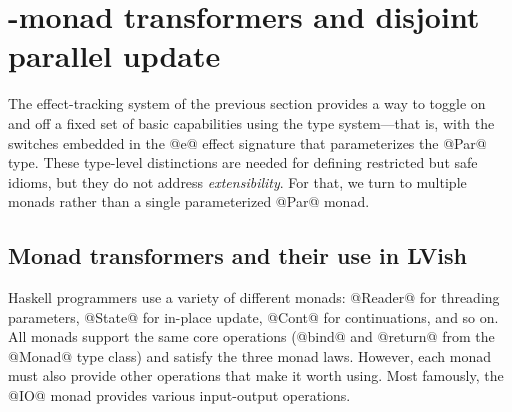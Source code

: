 \section{-monad transformers and disjoint parallel update}\label{section:lvish-par-monad-transformers-and-disjoint-parallel-update}



The effect-tracking system of the previous section provides a way to
toggle on and off a fixed set of basic capabilities using the type
system---that is, with the switches embedded in the @e@ effect
signature that parameterizes the @Par@ type.  These type-level
distinctions are needed for defining restricted but safe idioms, but
they do not address \emph{extensibility}.  For that, we turn to
multiple monads rather than a single parameterized @Par@ monad.


\subsection{Monad transformers and their use in LVish}

Haskell programmers use a variety of different monads: @Reader@ for
threading parameters, @State@ for in-place update, @Cont@ for
continuations, and so on.  All monads support the same core operations
(@bind@ and @return@ from the @Monad@ type class) and satisfy the
three monad laws.  However, each monad must also provide other
operations that make it worth using.  Most famously, the @IO@ monad
provides various input-output operations.

